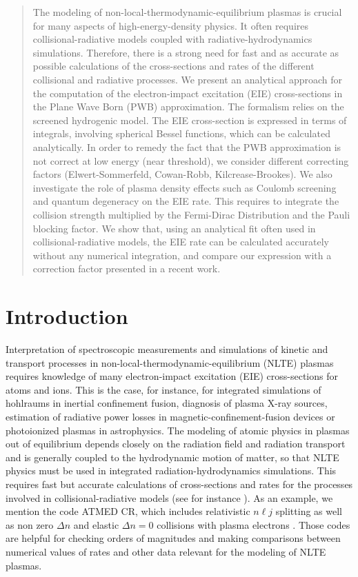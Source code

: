 \documentclass[a4paper,10pt]{article}
\begin{document}
\vspace{0.5cm}

\begin{abstract}
The modeling of non-local-thermodynamic-equilibrium plasmas is crucial for many aspects of high-energy-density physics. It often requires collisional-radiative models coupled with radiative-hydrodynamics simulations. Therefore, there is a strong need for fast and as accurate as possible calculations of the cross-sections and rates of the different collisional and radiative processes. We present an analytical approach for the computation of the electron-impact excitation (EIE) cross-sections in the Plane Wave Born (PWB) approximation. The formalism relies on the screened hydrogenic model. The EIE cross-section is expressed in terms of integrals, involving spherical Bessel functions, which can be calculated analytically. In order to remedy the fact that the PWB approximation is not correct at low energy (near threshold), we consider different correcting factors (Elwert-Sommerfeld, Cowan-Robb, Kilcrease-Brookes). We also investigate the role of plasma density effects such as Coulomb screening and quantum degeneracy on the EIE rate. This requires to integrate the collision strength multiplied by the Fermi-Dirac Distribution and the Pauli blocking factor. We show that, using an analytical fit often used in collisional-radiative models, the EIE rate can be calculated accurately without any numerical integration, and compare our expression with a correction factor presented in a recent work.
\end{abstract}

\section{Introduction}\label{sec1}

Interpretation of spectroscopic measurements and simulations of kinetic and transport processes in non-local-thermodynamic-equilibrium (NLTE) plasmas requires knowledge of many electron-impact excitation (EIE) cross-sections for atoms and ions. This is the case, for instance, for integrated simulations of hohlraums in inertial confinement fusion, diagnosis of plasma X-ray sources, estimation of radiative power losses in magnetic-confinement-fusion devices or photoionized plasmas in astrophysics. The modeling of atomic physics in plasmas out of equilibrium depends closely on the radiation field and radiation transport and is generally coupled to the hydrodynamic motion of matter, so that NLTE physics must be used in integrated radiation-hydrodynamics simulations. This requires fast but accurate calculations of cross-sections and rates for the processes involved in collisional-radiative models (see for instance \cite{CHUNG05,SCOTT10,BENITA15,VICHEV19}). As an example, we mention the code ATMED CR, which includes relativistic $n\ell j$ splitting as well as non zero $\Delta n$ and elastic $\Delta n=0$ collisions with plasma electrons \cite{benita,benita17,benita19}. Those codes are helpful for checking orders of magnitudes and making comparisons between numerical values of rates and other data relevant for the modeling of NLTE plasmas.
\end{document}
